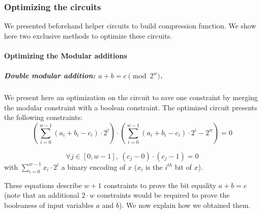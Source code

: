 \subsubsection{Optimizing the circuits}\label{implementation:efficiency:blake:optimization}

We presented beforehand helper circuits to build  compression function. We show here two exclusive methods to optimize these circuits.

\paragraph{Optimizing the Modular additions}\label{implementation:efficiency:blake:optimization:mod-circuits}

\subparagraph{Double modular addition: {\boldmath $a + b = c \pmod {2^w}$}.}
We present here an optimization on the circuit to save one constraint by merging the modular constraint with a boolean constraint. The optimized circuit presents the following constraints:
\begin{equation}
  \label{implementation:eq:modular_to_prove}
  \left ( \sum_{i=0}^{w - 1} ( a_i + b_i - c_i ) \cdot 2^i \right ) \cdot \left ( \sum_{i=0}^{w - 1} ( a_i + b_i - c_i ) \cdot 2^i - 2^{w} \right ) = 0
\end{equation}

\begin{equation}
  \label{implementation:eq:modular_bool_to_prove}
  \forall j \in [ 0, w - 1 ],\ (c_j - 0) \cdot (c_j - 1) = 0
\end{equation}
with $\sum_{i=0}^{w - 1} x_i \cdot 2^i$ a binary encoding of $x$ ($x_i$ is the $i^{th}$ bit of $x$).

These equations describe $w+1$ constraints to prove the bit equality $a + b = c$ (note that an additional $2\cdot w$ constraints would be required to prove the booleaness of input variables $a$ and $b$). We now explain how we obtained them.

